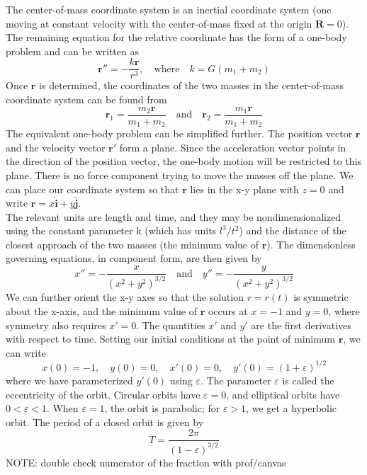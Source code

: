 \documentclass{article}
\begin{document}
\noindent The center-of-mass coordinate system is an inertial coordinate system (one moving at constant velocity with the center-of-mass fixed at the origin $\mathbf{R} = 0$). The remaining equation for the relative coordinate has the form of a one-body problem and can be written as
\begin{equation}
    \mathbf{r''}=-\frac{k\mathbf{r}}{r^3},\quad\text{where}\quad k=G(m_1+m_2)
\end{equation}
Once $\mathbf{r}$ is determined, the coordinates of the two masses in the center-of-mass coordinate system can be found from
\begin{equation}
    \mathbf{r}_1=\frac{m_2\mathbf{r}}{m_1+m_2}\quad\text{and}\quad\mathbf{r}_2=\frac{m_1\mathbf{r}}{m_1+m_2}
\end{equation}
The equivalent one-body problem can be simplified further. The position vector $\mathbf{r}$ and the velocity vector $\mathbf{r'}$ form a plane. Since the acceleration vector points in the direction of the position vector, the one-body motion will be restricted to this plane. There is no force component trying to move the masses off the plane. We can place our coordinate system so that $\mathbf{r}$ lies in the x-y plane with $z = 0$ and write $\mathbf{r} = x \mathbf{\hat{i}} + y \mathbf{\hat{j}}$.\\

\noindent The relevant units are length and time, and they may be nondimensionalized using the constant parameter k (which has units $l^3/t^2$) and the distance of the closest approach of the two masses (the minimum value of $\mathbf{r}$). The dimensionless governing equations, in component form, are then given by
\begin{equation}
    x''=-\frac{x}{(x^2+y^2)^{3/2}}\quad\text{and}\quad y''=-\frac{y}{(x^2+y^2)^{3/2}}
\end{equation}
We can further orient the x-y axes so that the solution $r = r(t)$ is symmetric about the x-axis, and the minimum value of $\mathbf{r}$ occurs at $x = -1$ and $y = 0$, where symmetry also requires $x' = 0$. The quantities $x'$ and $y'$ are the first derivatives with respect to time. Setting our initial conditions at the point of minimum $\mathbf{r}$, we can write
\begin{equation}
    x(0)=-1,\quad y(0)=0,\quad x'(0)=0,\quad y'(0)=(1+\varepsilon)^{1/2}
\end{equation}
where we have parameterized $y'(0)$ using $\varepsilon$. The parameter $\varepsilon$ is called the eccentricity of the orbit. Circular orbits have $\varepsilon = 0$, and elliptical orbits have $0 < \varepsilon < 1$. When $\varepsilon = 1$, the orbit is parabolic; for $\varepsilon > 1$, we get a hyperbolic orbit. The period of a closed orbit is given by
\begin{equation}
    T=\frac{2\pi}{(1-\varepsilon)^{3/2}}
\end{equation}
NOTE: double check numerator of the fraction with prof/canvas\\
\end{document}
